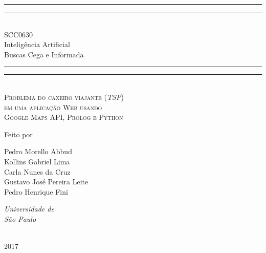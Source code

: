 \documentclass[12pt,a4paper]{article}
\begin{document}
\newcommand*{\plogo}{\fbox{$\mathcal{ICMC}$}} %


\newcommand*{\titleGP}{\begingroup %
\vspace*{\baselineskip} %

\rule{\textwidth}{1.6pt}\vspace*{-\baselineskip}\vspace*{2pt} %
\rule{\textwidth}{0.4pt}\\[\baselineskip] %

{\LARGE SCC0630\\ Inteligência Artificial\\[0.5\baselineskip] Buscas Cega e Informada}\\[0.2\baselineskip] %

\rule{\textwidth}{0.4pt}\vspace*{-\baselineskip}\vspace{3.2pt} %
\rule{\textwidth}{1.6pt}\\[\baselineskip] %

\scshape %
Problema do caxeiro viajante (\emph{TSP})\\ %
em uma aplicação Web usando \\ %
Google Maps API, Prolog e Python\par %

\vspace*{2\baselineskip} %

Feito por\\[\baselineskip]
{\Large Pedro Morello Abbud\\ 
Kollins Gabriel Lima 	\\	
Carla Nunes da Cruz 	\\
Gustavo José Pereira Leite \\	
Pedro Henrique Fini 		\par} %

\vfill %
{\itshape Universidade de\\ São Paulo\par} %

\vfill %

\plogo \\[0.3\baselineskip] %
{\scshape 2017} \\[0.3\baselineskip] %

\endgroup}
\titleGP
\newpage
\end{document}
